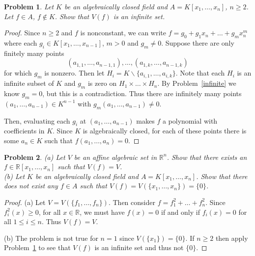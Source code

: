 \documentclass{article}
\newtheorem{problem}{Problem}
\begin{document}
\begin{problem}
\label{infinite2}
Let $K$ be an algebraically closed field and $A = K[x_1, \dots , x_n]$, $n \geq 2$. Let $f \in A$, $f \notin K$. Show that $V(f)$ is an infinite set.
\end{problem}
\begin{proof}
Since $n \geq 2$ and $f$ is nonconstant, we can write $f = g_0 + g_1 x_n + \dots + g_m x_n^m$ where each $g_i \in K[x_1, \dots , x_{n-1}]$, $m > 0$ and $g_m \neq 0$. Suppose there are only finitely many points
\[
(a_{1,1}, \dots , a_{n-1,1}), \dots , (a_{1,k}, \dots , a_{n-1,k})
\]
for which $g_m$ is nonzero. Then let $H_i = K \backslash \{a_{i,1}, \dots , a_{i,k}\}$. Note that each $H_i$ is an infinite subset of $K$ and $g_m$ is zero on $H_1 \times \dots \times H_n$. By Problem~\ref{infinite} we know $g_m = 0$, but this is a contradiction. Thus there are infinitely many points $(a_1, \dots , a_{n-1}) \in K^{n-1}$ with $g_m(a_1, \dots , a_{n-1}) \neq 0$.

Then, evaluating each $g_i$ at $(a_1, \dots , a_{n-1})$ makes $f$ a polynomial with coefficients in $K$. Since $K$ is algebraically closed, for each of these points there is some $a_n \in K$ such that $f(a_1, \dots , a_n) = 0$.
\end{proof}

\begin{problem}
(a) Let $V$ be an affine algebraic set in $\mathbb{R}^n$. Show that there exists an $f \in \mathbb{R}[x_1, \dots , x_n]$ such that $V(f) = V$.\\
(b) Let $K$ be an algebraically closed field and $A = K[x_1, \dots , x_n]$. Show that there does not exist any $f \in A$ such that $V(f) = V(\{x_1, \dots , x_n\}) = \{0\}$.
\end{problem}
\begin{proof}
(a) Let $V = V(\{f_1, \dots , f_n\})$. Then consider $f = f_1^2 + \dots + f_n^2$. Since $f_i^2(x) \geq 0$, for all $x \in \mathbb{R}$, we must have $f(x) = 0$ if and only if $f_i(x) = 0$ for all $1 \leq i \leq n$. Thus $V(f) = V$.

(b) The problem is not true for $n = 1$ since $V(\{x_1\}) = \{0\}$. If $n \geq 2$ then apply Problem~\ref{infinite2} to see that $V(f)$ is an infinite set and thus not $\{0\}$.
\end{proof}
\end{document}
